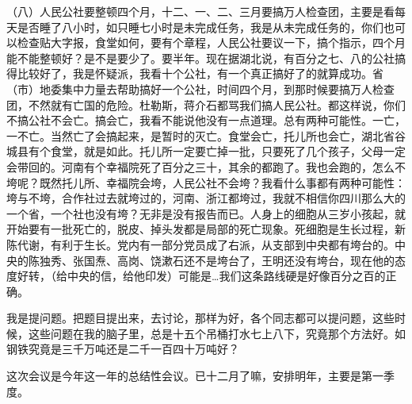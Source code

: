 （八）人民公社要整顿四个月，十二、一、二、三月要搞万人检查团，主要是看每天是否睡了八小时，如只睡七小时是未完成任务，我是从未完成任务的，你们也可以检查贴大字报，食堂如何，要有个章程，人民公社要议一下，搞个指示，四个月能不能整顿好？是不是要少了。要半年。现在据湖北说，有百分之七、八的公社搞得比较好了，我是怀疑派，我看十个公社，有一个真正搞好了的就算成功。省（市）地委集中力量去帮助搞好一个公社，时间四个月，到那时候要搞万人检查团，不然就有亡国的危险。杜勒斯，蒋介石都骂我们搞人民公社。都这样说，你们不搞公社不会亡。搞会亡，我看不能说他没有一点道理。总有两种可能性。一亡，一不亡。当然亡了会搞起来，是暂时的灭亡。食堂会亡，托儿所也会亡，湖北省谷城县有个食堂，就是如此。托儿所一定要亡掉一批，只要死了几个孩子，父母一定会带回的。河南有个幸福院死了百分之三十，其余的都跑了。我也会跑的，怎么不垮呢？既然托儿所、幸福院会垮，人民公社不会垮？我看什么事都有两种可能性：垮与不垮，合作社过去就垮过的，河南、浙江都垮过，我就不相信你四川那么大的一个省，一个社也没有垮？无非是没有报告而已。人身上的细胞从三岁小孩起，就开始要有一批死亡的，脱皮、掉头发都是局部的死亡现象。死细胞是生长过程，新陈代谢，有利于生长。党内有一部分党员成了右派，从支部到中央都有垮台的。中央的陈独秀、张国焘、高岗、饶漱石还不是垮台了，王明还没有垮台，现在他的态度好转，（给中央的信，给他印发）可能是…我们这条路线硬是好像百分之百的正确。

我是提问题。把题目提出来，去讨论，那样为好，各个同志都可以提问题，这些时候，这些问题在我的脑子里，总是十五个吊桶打水七上八下，究竟那个方法好。如钢铁究竟是三千万吨还是二千一百四十万吨好？

这次会议是今年这一年的总结性会议。已十二月了嘛，安排明年，主要是第一季度。


